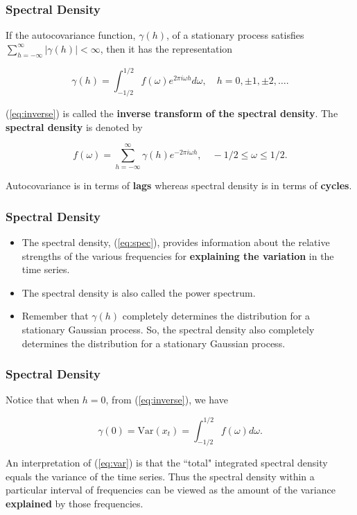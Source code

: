 \documentclass[%
xcolor=pdftex]{beamer}
\begin{document}
\begin{frame}
\frametitle{Spectral Density}

If the autocovariance function, $\gamma(h)$, of a stationary process satisfies $\sum_{h=-\infty}^{\infty}  |\gamma(h)| < \infty$, then it has the representation

\begin{equation} \label{eq:inverse}
\gamma(h) = \int^{1/2}_{-1/2} f(\omega) e^{2\pi i\omega h} d\omega, \quad h=0,\pm 1,\pm 2,\ldots.
\end{equation}

(\ref{eq:inverse}) is called the \textbf{inverse transform of the spectral density}. The \textbf{spectral density} is denoted by

\begin{equation} \label{eq:spec}
f(\omega)  = \sum^\infty_{h=-\infty} \gamma(h) e^{-2\pi i\omega h}, \quad -1/2 \leq \omega \leq 1/2.
\end{equation}

Autocovariance is in terms of \textbf{lags} whereas spectral density is in terms of \textbf{cycles}.


\end{frame}


\begin{frame}
\frametitle{Spectral Density}

\begin{itemize}
\item The spectral density, (\ref{eq:spec}), provides information about the relative strengths of the various frequencies for \textbf{explaining the variation} in the time series.
\item The spectral density is also called the power spectrum.  
\item Remember
that $\gamma(h)$ completely determines the distribution for a
stationary Gaussian process.  So, the spectral density also
completely determines the distribution for a
stationary Gaussian process.
\end{itemize}

\end{frame}

\begin{frame}
\frametitle{Spectral Density}


Notice that when $h=0$, from (\ref{eq:inverse}), we have

\begin{equation} \label{eq:var}
\gamma(0) = \mbox{Var}(x_t) = \int^{1/2}_{-1/2} f(\omega) d\omega.
\end{equation}

An interpretation of (\ref{eq:var}) is that the ``total" integrated spectral density equals the variance of the time series.  Thus the spectral density within a particular interval of frequencies can be viewed as the amount of the variance \textbf{explained} by those frequencies.

\end{frame}
\end{document}
